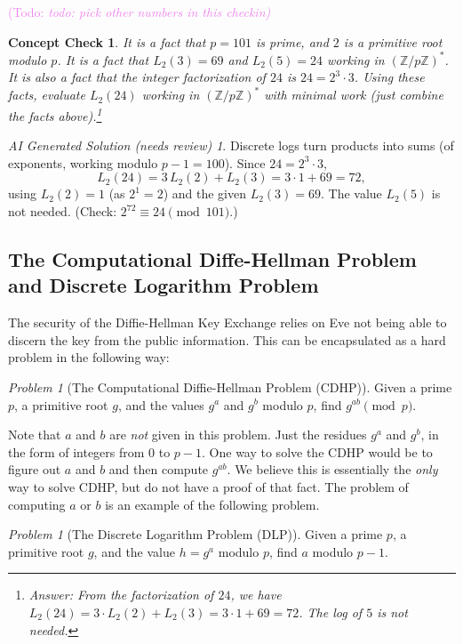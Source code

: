 \documentclass{article}
\theoremstyle{plain}
\newtheorem{checkin}[theorem]{Concept Check}
\theoremstyle{definition}
\theoremstyle{remark}
\newtheorem{problem}[theorem]{Problem}
\newtheorem*{aisolution}{AI Generated Solution (needs review)}
\numberwithin{theorem}{section}
\newcommand{\KS}[1]{\textcolor{violet}{{\sf (Todo:} {\sl{#1})}}}
\newcommand{\KS}[1]{}
\newcommand{\ZZ}{\mathbb{Z}}
\begin{document}
\KS{todo: pick other numbers in this checkin}
\begin{checkin}
    It is a fact that $p=101$ is prime, and $2$ is a primitive root modulo $p$.  It is a fact that $L_2(3)=69$ and $L_2(5)=24$ working in $(\ZZ/p\ZZ)^*$.   It is also a fact that the integer factorization of $24$ is $24 = 2^3 \cdot 3$.  Using these facts, evaluate $L_2(24)$ working in $(\ZZ/p\ZZ)^*$ with minimal work (just combine the facts above).\footnote{Answer: From the factorization of $24$, we have $L_2(24) = 3 \cdot L_2(2) + L_2(3) = 3 \cdot 1 + 69 = 72$.  The log of $5$ is not needed.}
\end{checkin}
\begin{aisolution}
Discrete logs turn products into sums (of exponents, working modulo $p-1 = 100$).  Since $24 = 2^3\cdot 3$,
\[
L_2(24) = 3\,L_2(2) + L_2(3) = 3\cdot 1 + 69 = 72,
\]
using $L_2(2) = 1$ (as $2^1 = 2$) and the given $L_2(3) = 69$.  The value $L_2(5)$ is not needed.  (Check: $2^{72} \equiv 24 \pmod{101}$.)
\end{aisolution}



\subsection{The Computational Diffe-Hellman Problem and Discrete Logarithm Problem}

The security of the Diffie-Hellman Key Exchange relies on Eve not being able to discern the key from the public information.  This can be encapsulated as a hard problem in the following way:

\begin{problem}[The Computational Diffie-Hellman Problem (CDHP)]
	Given a prime $p$, a primitive root $g$, and the values $g^a$ and $g^b$ modulo $p$, find $g^{ab} \pmod p$.
\end{problem}

Note that $a$ and $b$ are \emph{not} given in this problem.  Just the residues $g^a$ and $g^b$, in the form of integers from $0$ to $p-1$.  One way to solve the CDHP would be to figure out $a$ and $b$ and then compute $g^{ab}$.  We believe this is essentially the \emph{only} way to solve CDHP, but do not have a proof of that fact.  The problem of computing $a$ or $b$ is an example of the following problem.

\begin{problem}[The Discrete Logarithm Problem (DLP)]
	Given a prime $p$, a primitive root $g$, and the value $h = g^a$ modulo $p$, find $a$ modulo $p-1$.
\end{problem}
\end{document}

